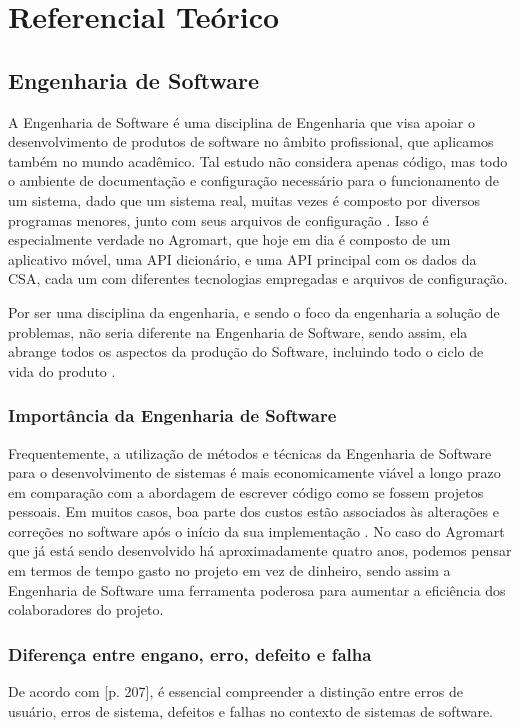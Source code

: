 \chapter[Referencial Teórico]{Referencial Teórico}

\section{Engenharia de Software}

A Engenharia de Software é uma disciplina de Engenharia que visa apoiar o desenvolvimento de produtos de software no âmbito profissional, que aplicamos também no mundo acadêmico. Tal estudo não considera apenas código, mas todo o ambiente de documentação e configuração necessário para o funcionamento de um sistema, dado que um sistema real, muitas vezes é composto por diversos programas menores, junto com seus arquivos de configuração \cite{Sommerville2007}. Isso é especialmente verdade no Agromart, que hoje em dia é composto de um aplicativo móvel, uma API dicionário, e uma API principal com os dados da CSA, cada um com diferentes tecnologias empregadas e arquivos de configuração.

Por ser uma disciplina da engenharia, e sendo o foco da engenharia a solução de problemas, não seria diferente na Engenharia de Software, sendo assim, ela abrange todos os aspectos da produção do Software, incluindo todo o ciclo de vida do produto \cite{Sommerville2007}.

\subsection{Importância da Engenharia de Software}
Frequentemente, a utilização de métodos e técnicas da Engenharia de Software para o desenvolvimento de sistemas é mais economicamente viável a longo prazo em comparação com a abordagem de escrever código como se fossem projetos pessoais. Em muitos casos, boa parte dos custos estão associados às alterações e correções no software após o início da sua implementação \cite{Sommerville2007}. No caso do Agromart que já está sendo desenvolvido há aproximadamente quatro anos, podemos pensar em termos de tempo gasto no projeto em vez de dinheiro, sendo assim a Engenharia de Software uma ferramenta poderosa para aumentar a eficiência dos colaboradores do projeto.

\subsection{Diferença entre engano, erro, defeito e falha}
De acordo com \citeauthor{Sommerville2007} [p. 207], é essencial compreender a distinção entre erros de usuário, erros de sistema, defeitos e falhas no contexto de sistemas de software.

